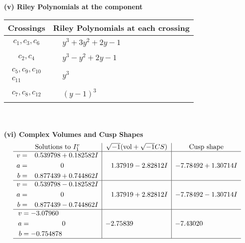 \documentclass[1p]{elsarticle_modified}
\theoremstyle{definition}
\newcommand{\I}{\sqrt{-1}}
\begin{document}
\newpage\renewcommand{\arraystretch}{1}
\flushleft \textbf{(v) Riley Polynomials at the component}\newline \\
\begin{tabular}{m{50pt}|m{274pt}}
Crossings & \hspace{64pt}Riley Polynomials at each crossing \\
\hline $$\begin{aligned}c_{1},c_{3},c_{6}\end{aligned}$$&$\begin{aligned}
&y^3+3 y^2+2 y-1
\end{aligned}$\\
\hline $$\begin{aligned}c_{2},c_{4}\end{aligned}$$&$\begin{aligned}
&y^3- y^2+2 y-1
\end{aligned}$\\
\hline $$\begin{aligned}c_{5},c_{9},c_{10}\\c_{11}\end{aligned}$$&$\begin{aligned}
&y^3
\end{aligned}$\\
\hline $$\begin{aligned}c_{7},c_{8},c_{12}\end{aligned}$$&$\begin{aligned}
&(y-1)^3
\end{aligned}$\\
\hline
\end{tabular}\\~\\
\newpage\flushleft \textbf{(vi) Complex Volumes and Cusp Shapes}
$$\begin{array}{c|c|c}  
\text{Solutions to }I^v_{1}& \I (\text{vol} + \sqrt{-1}CS) & \text{Cusp shape}\\
 \hline 
\begin{aligned}
v &= \phantom{-}0.539798 + 0.182582 I \\
a &= \phantom{-0.000000 } 0 \\
b &= \phantom{-}0.877439 + 0.744862 I\end{aligned}
 & \phantom{-}1.37919 - 2.82812 I & -7.78492 + 1.30714 I \\ \hline\begin{aligned}
v &= \phantom{-}0.539798 - 0.182582 I \\
a &= \phantom{-0.000000 } 0 \\
b &= \phantom{-}0.877439 - 0.744862 I\end{aligned}
 & \phantom{-}1.37919 + 2.82812 I & -7.78492 - 1.30714 I \\ \hline\begin{aligned}
v &= -3.07960\phantom{ +0.000000I} \\
a &= \phantom{-0.000000 } 0 \\
b &= -0.754878\phantom{ +0.000000I}\end{aligned}
 & -2.75839\phantom{ +0.000000I} & -7.43020\phantom{ +0.000000I}\\
 \hline 
 \end{array}$$\newpage
\end{document}
